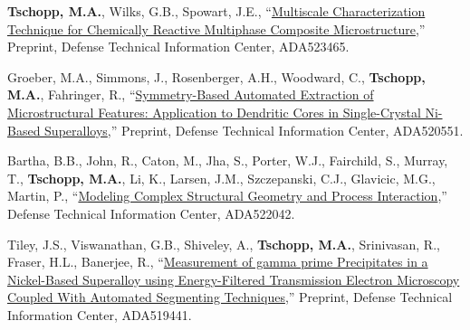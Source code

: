 \begin{cvlist}
\item 
\textbf{Tschopp, M.A.}, Wilks, G.B., Spowart, J.E., ``\href{http://www.dtic.mil/docs/citations/ADA523465}{Multiscale Characterization Technique for Chemically Reactive Multiphase Composite Microstructure},'' Preprint, Defense Technical Information Center, ADA523465. 

\item 
Groeber, M.A., Simmons, J., Rosenberger, A.H., Woodward, C., \textbf{Tschopp, M.A.},  Fahringer, R., ``\href{http://www.dtic.mil/docs/citations/ADA520551}{Symmetry-Based Automated Extraction of Microstructural Features: Application to Dendritic Cores in Single-Crystal Ni-Based Superalloys},'' Preprint, Defense Technical Information Center, ADA520551.

\item 
Bartha, B.B., John, R., Caton, M., Jha, S., Porter, W.J., Fairchild, S., Murray, T., \textbf{Tschopp, M.A.}, Li, K., Larsen, J.M., Szczepanski, C.J., Glavicic, M.G., Martin, P., ``\href{http://www.dtic.mil/docs/citations/ADA522042}{Modeling Complex Structural Geometry and Process Interaction},'' Defense Technical Information Center, ADA522042.

\item 
Tiley, J.S., Viswanathan, G.B., Shiveley, A., \textbf{Tschopp, M.A.}, Srinivasan, R., Fraser, H.L., Banerjee, R., ``\href{http://www.dtic.mil/docs/citations/ADA519441}{Measurement of gamma prime Precipitates in a Nickel-Based Superalloy using Energy-Filtered Transmission Electron Microscopy Coupled With Automated Segmenting Techniques},'' Preprint, Defense Technical Information Center, ADA519441.

\end{cvlist}
